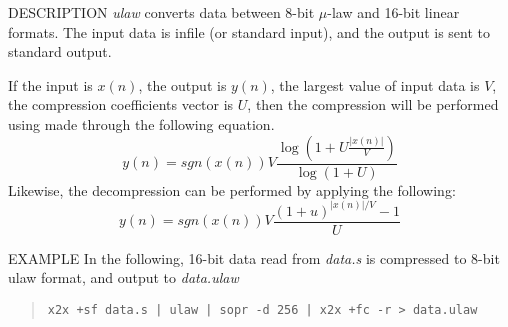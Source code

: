 \begin{synopsis}
\item[ulaw] [ --v $V$ ] [ --u $U$ ] [ --c ] [ --d ] [ {\em infile} ]
\end{synopsis}

\begin{qsection}{DESCRIPTION}
{\em ulaw} converts data between 8-bit $\mu$-law and 16-bit linear formats.
The input data is {\rm infile} (or standard input),
and the output is sent to standard output.

If the input is $x(n)$, the output is $y(n)$,
the largest value of input data is $V$, the compression coefficients vector is $U$,
then the compression will be performed using made through the following equation.
\begin{displaymath}
y(n) = sgn(x(n)) V \frac{\log(1 + U \frac{|x(n)|}{V} )}{\log(1+U)}
\end{displaymath}
Likewise, the decompression can be performed by applying the following:
\begin{displaymath}
y(n) = sgn(x(n)) V \frac{(1+u)^{|x(n)|/V} - 1}{U}
\end{displaymath}
\end{qsection}

\begin{options}
\end{options}

\begin{qsection}{EXAMPLE}
In the following, 16-bit data read from {\em data.s}
is compressed to 8-bit ulaw format, and output to {\em data.ulaw}
\begin{quote}
  \verb!x2x +sf data.s | ulaw | sopr -d 256 | x2x +fc -r > data.ulaw!
\end{quote}
\end{qsection}

